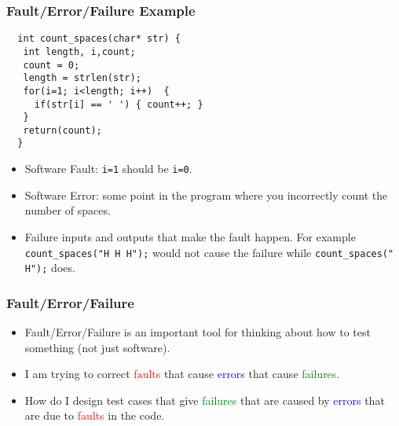 \documentclass[handout]{beamer}
\begin{document}
\begin{frame}[fragile]
  \frametitle{Fault/Error/Failure Example}
\begin{lstlisting}
  int count_spaces(char* str) {
   int length, i,count;
   count = 0;
   length = strlen(str);
   for(i=1; i<length; i++)  { 
     if(str[i] == ' ') { count++; }
   }
   return(count);
  }
\end{lstlisting}
  \begin{itemize}
  \item Software Fault: {\tt i=1} should be {\tt i=0}.
  \item Software Error: some point in the program where you
    incorrectly count the number of spaces.
  \item Failure  inputs and outputs that make the fault happen. For
    example {\tt count\_spaces("H H H");} would not cause the failure
    while {\tt count\_spaces(" H");} does.
  \end{itemize}
\end{frame}
\begin{frame}
  \frametitle{Fault/Error/Failure}
  \begin{itemize}
  \item Fault/Error/Failure is an important tool for thinking about how to
    test something (not just software).
  \item I am trying to correct \textcolor{red}{faults} that cause
    \textcolor{blue}{errors} that cause \textcolor{green}{failures}.
  \item How do I design test cases that give  \textcolor{green}{failures} that
    are caused by  \textcolor{blue}{errors} that are due to
    \textcolor{red}{faults} in the code.
  \end{itemize}
\end{frame}
\end{document}
